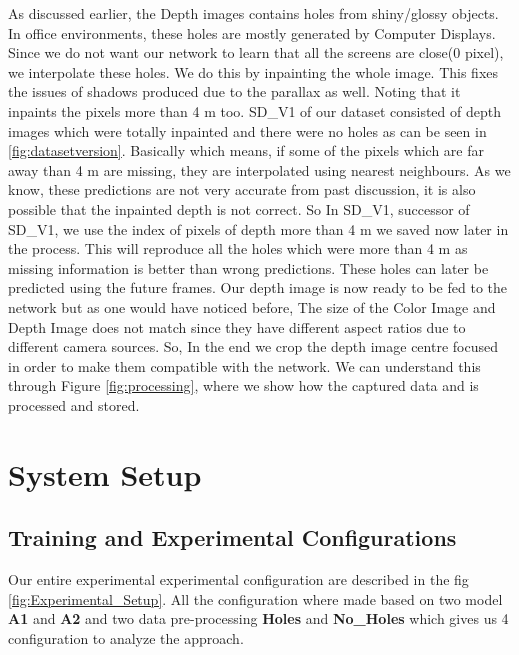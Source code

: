 As discussed earlier, the Depth images contains holes from shiny/glossy objects\cite{shiny}. In office environments, these holes are mostly generated by Computer Displays. Since we do not want our network to learn that all the screens are close(0 pixel), we interpolate these holes. We do this by inpainting \cite{inpainting} the whole image. This fixes the issues of shadows produced due to the parallax as well. Noting that it inpaints the pixels more than 4 m too. SD\_V1 of our dataset consisted of depth images which were totally inpainted and there were no holes as can be seen in \ref{fig:datasetversion}. Basically which means, if some of the pixels which are far away than 4 m are missing, they are interpolated using nearest neighbours. As we know, these predictions are not very accurate from past discussion, it is also possible that the inpainted depth is not correct. So In SD\_V1, successor of SD\_V1, we use the index of pixels of depth more than 4 m we saved now later in the process. This will reproduce all the holes which were more than 4 m as missing information is better than wrong predictions. These holes can later be predicted using the future frames. Our depth image is now ready to be fed to the network but as one would have noticed before, The size of the Color Image and Depth Image does not match since they have different aspect ratios due to different camera sources. So, In the end we crop the depth image centre focused in order to make them compatible with the network. We can understand this through Figure \ref{fig:processing}, where we show how the captured data and is processed and stored. \\



\newpage
\section{System Setup}
\label{Chapter5:Experimental_Setup}
\subsection{Training and Experimental Configurations}

 Our entire experimental experimental configuration are described in the fig \ref{fig:Experimental_Setup}. All the configuration where made based on two model \textbf{A1} and \textbf{A2} and two data pre-processing \textbf{Holes} and \textbf{No\_Holes} which gives us 4 configuration to analyze the approach. 


